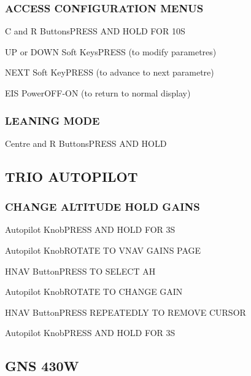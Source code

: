 \begin{multicols}{2}
\subsubsection*{ACCESS CONFIGURATION MENUS}
\begin{enumerate*}
\item C and R Buttons\dotfill PRESS AND HOLD FOR 10S
\item UP or DOWN Soft Keys\dotfill PRESS (to modify parametres)
\item NEXT Soft Key\dotfill PRESS (to advance to next parametre)
\item EIS Power\dotfill OFF-ON (to return to normal display)
\end{enumerate*}

\subsubsection*{LEANING MODE}
\begin{enumerate*}
\item Centre and R Buttons\dotfill PRESS AND HOLD
\end{enumerate*}

\subsection*{TRIO AUTOPILOT}
\subsubsection*{CHANGE ALTITUDE HOLD GAINS}
\begin{enumerate*}
\item Autopilot Knob\dotfill PRESS AND HOLD FOR 3S
\item Autopilot Knob\dotfill ROTATE TO VNAV GAINS PAGE
\item HNAV Button\dotfill PRESS TO SELECT AH
\item Autopilot Knob\dotfill ROTATE TO CHANGE GAIN
\item HNAV Button\dotfill PRESS REPEATEDLY TO REMOVE CURSOR
\item Autopilot Knob\dotfill PRESS AND HOLD FOR 3S
\end{enumerate*}



\columnbreak %
\subsection*{GNS 430W}

\end{multicols}
